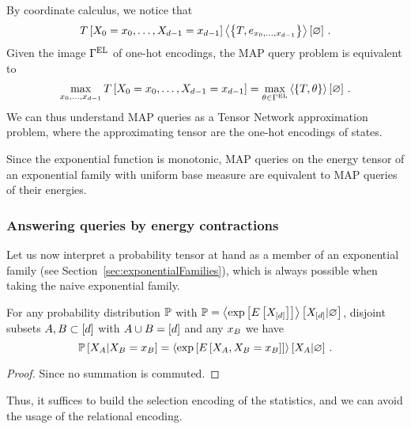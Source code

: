 By coordinate calculus, we notice that
\begin{align}
	T\left[X_{0}=x_{0},\ldots,X_{d-1}=x_{d-1}\right] 
	\left\langle \left\{T, e_{x_{0},\ldots,x_{d-1}}\right\}\right\rangle \left[ \varnothing \right] \, .
\end{align}
Given the image $\Gamma^{\mathrm{EL}}$ of one-hot encodings, the MAP query problem is equivalent to 
\begin{align}
	\max_{x_{0},\ldots,x_{d-1}} T\left[X_{0}=x_{0},\ldots,X_{d-1}=x_{d-1}\right] 
	= \max_{\theta\in\Gamma^{\mathrm{EL}}} \left\langle \left\{T, \theta\right\}\right\rangle \left[ \varnothing \right] \, .
\end{align}
We can thus understand MAP queries as a Tensor Network approximation problem, where the approximating tensor are the one-hot encodings of states.

\begin{remark}
	Since the exponential function is monotonic, MAP queries on the energy tensor of an exponential family with uniform base measure are equivalent to MAP queries of their energies.
\end{remark}


\subsubsection{Answering queries by energy contractions}

Let us now interpret a probability tensor at hand as a member of an exponential family (see Section~\ref{sec:exponentialFamilies}), which is always possible when taking the naive exponential family.

\begin{lemma}\label{lem:energyContractionQueries} %
	For any probability distribution $\mathbb{P}$ with $\mathbb{P}= \left\langle \mathrm{exp}\left[E\left[X_{[d]}\right]\right]\right\rangle \left[ X_{[d]} | \varnothing \right]$, disjoint subsets $A,B \subset [d]$ with $A\cup B=[d]$  and any $x_{B}$ we have
		\[ \mathbb{P}\left[X_{A}|X_{B}=x_{B}\right] 
			= \left\langle 
				\mathrm{exp}\left[E\left[X_{A},X_{B}=x_{B}\right]\right]
		\right\rangle \left[ X_{A} | \varnothing \right] \, .\]
\end{lemma}
\begin{proof}
	Since no summation is commuted.
\end{proof}

Thus, it suffices to build the selection encoding of the statistics, and we can avoid the usage of the relational encoding.

